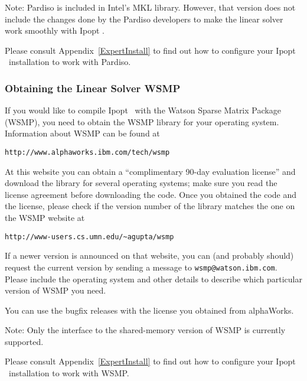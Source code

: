 \documentclass[10pt]{article}
\newcommand{\Ipopt}{{\sc Ipopt }}
\begin{document}
Note: Pardiso is included in Intel's MKL library.  However, that
version does not include the changes done by the Pardiso developers to
make the linear solver work smoothly with \Ipopt.

Please consult Appendix~\ref{ExpertInstall} to find out how to
configure your \Ipopt\ installation to work with Pardiso.

\subsubsection{Obtaining the Linear Solver WSMP}\label{sec:WSMP}

If you would like to compile \Ipopt\ with the Watson Sparse Matrix
Package (WSMP), you need to obtain the WSMP library for your operating
system.  Information about WSMP can be found at

\texttt{http://www.alphaworks.ibm.com/tech/wsmp}

At this website you can obtain a ``complimentary 90-day evaluation
license'' and download the library for several operating systems; make
sure you read the license agreement before downloading the code.  Once
you obtained the code and the license, please check if the version
number of the library matches the one on the WSMP website at

{\tt http://www-users.cs.umn.edu/\verb|~|agupta/wsmp}

If a newer version is announced on that website, you can (and
probably should) request the current version by sending a message to
\verb|wsmp@watson.ibm.com|.  Please include the operating system and
other details to describe which particular version of WSMP you need.

You can use the bugfix releases with the license you obtained from
alphaWorks.

Note: Only the interface to the shared-memory version of WSMP is
currently supported.

Please consult Appendix~\ref{ExpertInstall} to find out how to
configure your \Ipopt\ installation to work with WSMP.
\end{document}
